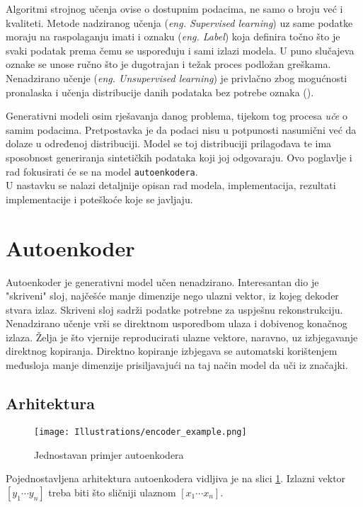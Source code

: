 Algoritmi strojnog učenja ovise o dostupnim podacima, ne samo o broju već i kvaliteti.
Metode nadziranog učenja (\emph{eng. Supervised learning}) uz same podatke moraju na raspolaganju imati i oznaku (\emph{eng. Label}) koja definira točno što je svaki podatak prema čemu se uspoređuju i sami izlazi modela.
U puno slučajeva oznake se unose ručno što je dugotrajan i težak proces podložan greškama.
Nenadzirano učenje (\emph{eng. Unsupervised learning}) je privlačno zbog mogućnosti pronalaska i učenja distribucije danih podataka bez potrebe oznaka (\cite{ev_var_ae}).

Generativni modeli osim rješavanja danog problema, tijekom tog procesa \emph{uče} o samim podacima.
Pretpostavka je da podaci nisu u potpunosti nasumični već da dolaze u određenoj distribuciji.
Model se toj distribuciji prilagođava te ima sposobnost generiranja sintetičkih podataka koji joj odgovaraju.
Ovo poglavlje i rad fokusirati će se na model \texttt{autoenkodera}. \\
U nastavku se nalazi detaljnije opisan rad modela, implementacija, rezultati implementacije i poteškoće koje se javljaju.

\section{Autoenkoder}
Autoenkoder je generativni model učen nenadzirano.
Interesantan dio je "skriveni" sloj, najčešće manje dimenzije nego ulazni vektor, iz kojeg dekoder stvara izlaz.
Skriveni sloj sadrži podatke potrebne za uspješnu rekonstrukciju.
Nenadzirano učenje vrši se direktnom usporedbom ulaza i dobivenog konačnog izlaza.
Želja je što vjernije reproducirati ulazne vektore, naravno, uz izbjegavanje direktnog kopiranja.
Direktno kopiranje izbjegava se automatski korištenjem međusloja manje dimenzije prisiljavajući na taj način model da uči iz značajki.

\subsection{Arhitektura}

\begin{figure}[H]
	\centering
	\texttt{[image: Illustrations/encoder\_example.png]}
	\caption{Jednostavan primjer autoenkodera}
	\label{fig:autoencoder_example}
\end{figure}

Pojednostavljena arhitektura autoenkodera vidljiva je na slici \ref{fig:autoencoder_example}.
Izlazni vektor $[y_1 \cdots y_n]$ treba biti što sličniji ulaznom $[x_1 \cdots x_n]$.

